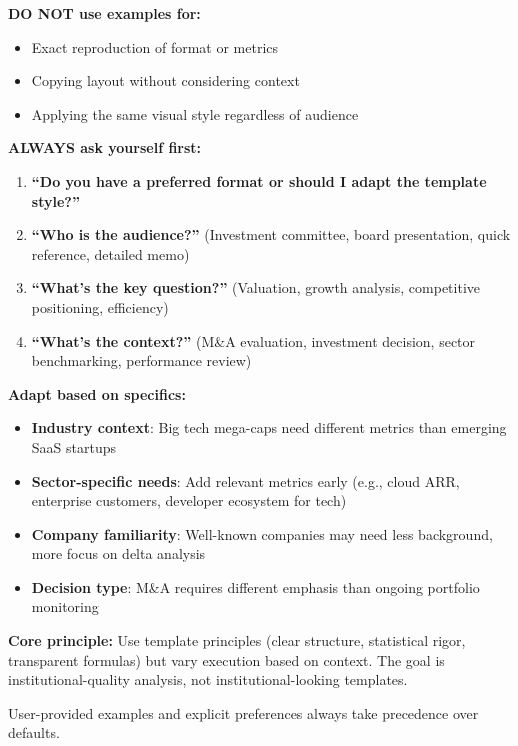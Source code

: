 \documentclass[11pt]{article}
\begin{document}
\textbf{DO NOT use examples for:}

\begin{itemize}[leftmargin=*,itemsep=2pt,topsep=2pt]
\item {} Exact reproduction of format or metrics
\item {} Copying layout without considering context
\item {} Applying the same visual style regardless of audience
\end{itemize}

\textbf{ALWAYS ask yourself first:}

\begin{enumerate}[leftmargin=*,itemsep=2pt,topsep=2pt]
\item {} \textbf{``Do you have a preferred format or should I adapt the template style?''}
\item {} \textbf{``Who is the audience?''} (Investment committee, board presentation, quick reference, detailed memo)
\item {} \textbf{``What's the key question?''} (Valuation, growth analysis, competitive positioning, efficiency)
\item {} \textbf{``What's the context?''} (M\&A evaluation, investment decision, sector benchmarking, performance review)
\end{enumerate}

\textbf{Adapt based on specifics:}

\begin{itemize}[leftmargin=*,itemsep=2pt,topsep=2pt]
\item {} \textbf{Industry context}: Big tech mega-caps need different metrics than emerging SaaS startups
\item {} \textbf{Sector-specific needs}: Add relevant metrics early (e.g., cloud ARR, enterprise customers, developer ecosystem for tech)
\item {} \textbf{Company familiarity}: Well-known companies may need less background, more focus on delta analysis
\item {} \textbf{Decision type}: M\&A requires different emphasis than ongoing portfolio monitoring
\end{itemize}

\textbf{Core principle:} Use template principles (clear structure, statistical rigor, transparent formulas) but vary execution based on context. The goal is institutional-quality analysis, not institutional-looking templates.


User-provided examples and explicit preferences always take precedence over defaults.
\end{document}
